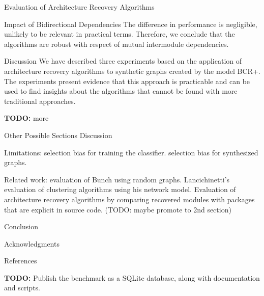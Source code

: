 \documentclass[11pt,twocolumn,a4paper,english]{article}
\newcommand{\TODO}{\textbf{TODO:} }
\begin{document}
\begin{section}{Evaluation of Architecture Recovery Algorithms}
\begin{subsection}{Impact of Bidirectional Dependencies}
	The difference in performance is negligible, unlikely to be relevant in practical terms. Therefore, we conclude that the algorithms are robust with respect of mutual intermodule dependencies.
	
	
\end{subsection}

\begin{subsection}{Discussion}
	We have described three experiments based on the application of architecture recovery algorithms to synthetic graphs created by the model BCR+. The experiments present evidence that this approach is practicable and can be used to find insights about the algorithms that cannot be found with more traditional approaches.
	
	\TODO more
	
\end{subsection}

\end{section}


\begin{section}{Other Possible Sections}
	Discussion
	
	Limitations: selection bias for training the classifier. selection bias for synthesized graphs.
	
	Related work: evaluation of Bunch using random graphs. Lancichinetti's evaluation of clustering algorithms using his network model. Evaluation of architecture recovery algorithms by comparing recovered modules with packages that are explicit in source code. (TODO: maybe promote to 2nd section)
	
	Conclusion
	
	Acknowledgments
	
	References	
	
	\TODO Publish the benchmark as a SQLite database, along with documentation and scripts.
	
\end{section}




\end{document}
